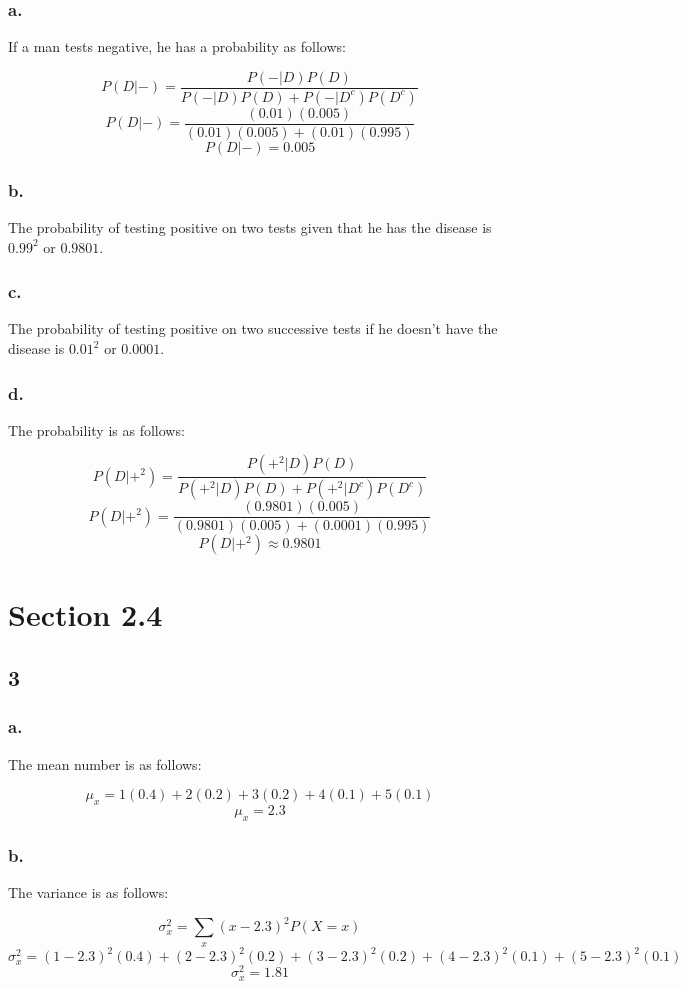\documentclass[11pt]{article}
\begin{document}
\subsubsection*{a.}
If a man tests negative, he has a probability as follows:

\[ P(D|-) = \frac{P(-|D)P(D)}{P(-|D)P(D)+P(-|D^c)P(D^c)} \]
\[ P(D|-) = \frac{(0.01)(0.005)}{(0.01)(0.005) + (0.01)(0.995)} \]
\[ P(D|-) = 0.005 \]

\subsubsection*{b.}
The probability of testing positive on two tests given that he has the disease
is $0.99^2$ or $0.9801$.

\subsubsection*{c.}
The probability of testing positive on two successive tests if he doesn't have
the disease is $0.01^2$ or $0.0001$. 

\subsubsection*{d.}
The probability is as follows:

\[ P(D|+^2) = \frac{P(+^2|D)P(D)}{P(+^2|D)P(D)+P(+^2|D^c)P(D^c)} \]
\[ P(D|+^2) = \frac{(0.9801)(0.005)}{(0.9801)(0.005)+(0.0001)(0.995)} \]
\[ P(D|+^2) \approx 0.9801  \]

\section*{Section 2.4}
\subsection*{3}
\subsubsection*{a.}
The mean number is as follows:

\[ \mu_x = 1(0.4)+2(0.2)+3(0.2)+4(0.1)+5(0.1) \]
\[ \mu_x = 2.3 \]

\subsubsection*{b.}
The variance is as follows:

\[ \sigma^2_x = \sum_x {(x-2.3)}^2 P(X=x) \]
\[ \sigma^2_x = {(1-2.3)}^2 (0.4) + {(2-2.3)}^2(0.2) + {(3-2.3)}^2(0.2) +
                {(4-2.3)}^2(0.1) + {(5-2.3)}^2(0.1) \]
\[ \sigma^2_x = 1.81 \]
\end{document}
